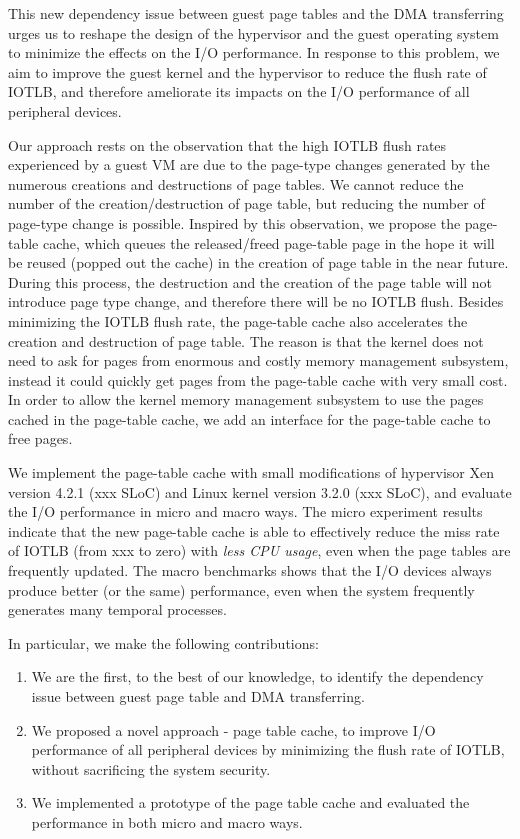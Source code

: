 
This new dependency issue between guest page tables and the DMA transferring urges us to reshape the design of the hypervisor and the guest operating system to minimize the effects on the I/O performance.
In response to this problem, we aim to improve the guest kernel and the hypervisor to reduce the flush rate of IOTLB, and therefore ameliorate its impacts on the I/O performance of all peripheral devices.

Our approach rests on the observation that the high IOTLB flush rates experienced by a guest VM
are due to the page-type changes generated by the numerous creations and destructions of page tables.
We cannot reduce the number of the creation/destruction of page table, but reducing the number of page-type change is possible.
Inspired by this observation, we propose the page-table cache, which queues the released/freed page-table page in the hope
it will be reused (popped out the cache) in the creation of page table in the near future.
During this process, the destruction and the creation of the page table will not introduce page type change, and therefore there will be no IOTLB flush.
Besides minimizing the IOTLB flush rate, the page-table cache also accelerates the creation and destruction of page table.
The reason is that the kernel does not need to ask for pages from enormous and costly memory management subsystem, instead it could quickly get pages from the page-table cache with very small cost.
In order to allow the kernel memory management subsystem to use the pages cached in the page-table cache, we add an interface for the page-table cache to free pages.

We implement the page-table cache with small modifications of hypervisor Xen version 4.2.1 (xxx SLoC) and Linux kernel version 3.2.0 (xxx SLoC), and evaluate the I/O performance in micro and macro ways.
The micro experiment results indicate that the new page-table cache is able to effectively reduce the miss rate of IOTLB (from xxx to zero) with \emph{less CPU usage}, even when the page tables are frequently updated.
The macro benchmarks shows that the I/O devices always produce better (or the same) performance, even when the system frequently generates many temporal processes.


In particular, we make the following contributions:
\begin{enumerate}
\item We are the first, to the best of our knowledge, to identify the dependency issue between guest page table and DMA transferring.
\item We proposed a novel approach - page table cache, to improve I/O performance of all peripheral devices by minimizing the flush rate of IOTLB, without sacrificing the system security.
\item We implemented a prototype of the page table cache and evaluated the performance in both micro and macro ways.
\end{enumerate}

